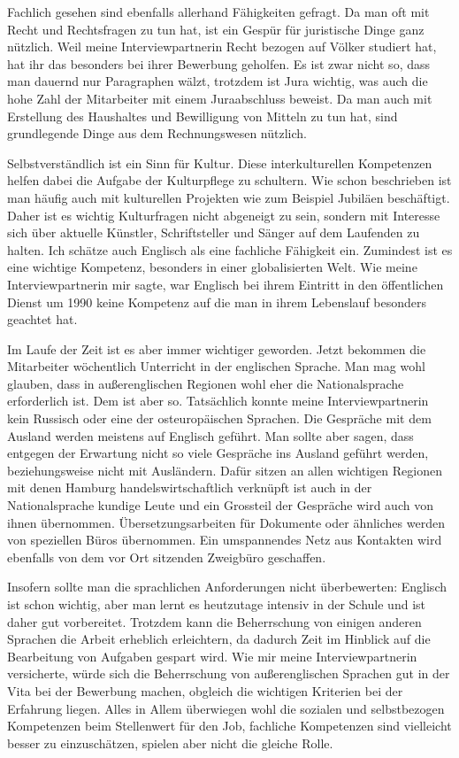 \documentclass[12pt,headsepline,a4paper]{scrartcl}
\begin{document}
Fachlich gesehen sind ebenfalls allerhand Fähigkeiten gefragt.
Da man oft mit Recht und Rechtsfragen zu tun hat, ist ein Gespür für juristische Dinge ganz nützlich. Weil meine Interviewpartnerin Recht bezogen auf Völker studiert hat, hat ihr das besonders bei ihrer Bewerbung geholfen. Es ist zwar nicht so, dass man dauernd nur Paragraphen wälzt, trotzdem  ist Jura wichtig, was auch die hohe Zahl der Mitarbeiter mit einem Juraabschluss beweist.
Da man auch mit Erstellung des Haushaltes und Bewilligung von Mitteln zu tun hat, sind grundlegende Dinge aus dem Rechnungswesen nützlich.

Selbstverständlich  ist ein Sinn für Kultur. Diese interkulturellen Kompetenzen helfen dabei die Aufgabe der Kulturpflege zu schultern. Wie schon beschrieben ist man häufig auch mit kulturellen Projekten wie zum Beispiel Jubiläen beschäftigt. Daher ist es wichtig Kulturfragen nicht abgeneigt zu sein, sondern mit Interesse sich über aktuelle Künstler, Schriftsteller und Sänger auf dem Laufenden zu halten.
Ich schätze auch Englisch als eine fachliche Fähigkeit ein. Zumindest ist es eine wichtige Kompetenz, besonders in einer globalisierten Welt. Wie meine Interviewpartnerin mir sagte, war Englisch bei ihrem Eintritt in den öffentlichen Dienst um 1990 keine Kompetenz auf die man in ihrem Lebenslauf besonders geachtet hat.

Im Laufe der Zeit ist es aber immer wichtiger geworden. Jetzt bekommen die Mitarbeiter wöchentlich Unterricht in der englischen Sprache. Man mag wohl glauben, dass in außerenglischen Regionen wohl eher die Nationalsprache erforderlich ist. Dem ist aber so. Tatsächlich konnte meine Interviewpartnerin kein Russisch oder eine der osteuropäischen Sprachen. Die Gespräche mit dem Ausland werden meistens auf Englisch geführt. Man sollte aber sagen, dass entgegen der Erwartung nicht so viele Gespräche ins Ausland geführt werden, beziehungsweise nicht mit Ausländern. Dafür sitzen an allen wichtigen Regionen mit denen Hamburg handelswirtschaftlich verknüpft ist auch in der Nationalsprache kundige Leute und ein Grossteil der Gespräche wird auch von ihnen übernommen. Übersetzungsarbeiten für Dokumente oder ähnliches werden  von speziellen Büros übernommen. Ein umspannendes Netz aus Kontakten wird ebenfalls von dem vor Ort sitzenden Zweigbüro geschaffen.

Insofern sollte man die sprachlichen Anforderungen nicht überbewerten: Englisch ist schon wichtig, aber man lernt es heutzutage intensiv in der Schule und ist daher gut vorbereitet. Trotzdem kann die Beherrschung von einigen anderen Sprachen die Arbeit erheblich erleichtern, da dadurch Zeit im Hinblick auf die Bearbeitung von Aufgaben gespart wird. Wie mir meine Interviewpartnerin versicherte, würde sich die Beherrschung von außerenglischen Sprachen gut in der Vita bei der Bewerbung machen, obgleich die wichtigen  Kriterien bei der Erfahrung liegen.
Alles in Allem überwiegen wohl die sozialen und selbstbezogen Kompetenzen beim Stellenwert für den Job, fachliche Kompetenzen sind vielleicht besser zu einzuschätzen, spielen aber nicht die gleiche Rolle.
\end{document}

